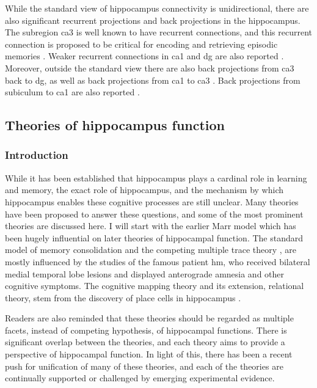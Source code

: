 While the standard view of hippocampus connectivity is unidirectional, there are also significant recurrent projections and back projections in the hippocampus. The subregion \gls{ca3} is well known to have recurrent connections, and this recurrent connection is proposed to be critical for encoding and retrieving episodic memories \citep{nakazawa02, rolls07}. Weaker recurrent connections in \gls{ca1} and \gls{dg} are also reported \citep{swanson81, ishizuka90, buckmaster93}. Moreover, outside the standard view there are also back projections from \gls{ca3} back to \gls{dg}, as well as back projections from \gls{ca1} to \gls{ca3} \citep{swanson81, li94}. Back projections from subiculum to \gls{ca1} are also reported \citep{finch83}. 

\subsection{Theories of hippocampus function}
\subsubsection{Introduction}
While it has been established that hippocampus plays a cardinal role in learning and memory, the exact role of hippocampus, and the mechanism by which hippocampus enables these cognitive processes are still unclear. Many theories have been proposed to answer these questions, and some of the most prominent theories are discussed here. I will start with the earlier Marr model \citep{marr71} which has been hugely influential on later theories of hippocampal function. The standard model of memory consolidation \citep{squire92} and the competing multiple trace theory \citep{nadel97}, are mostly influenced by the studies of the famous patient \gls{hm}, who received bilateral medial temporal lobe lesions and displayed anterograde amnesia and other cognitive symptoms. The cognitive mapping theory and its extension, relational theory, stem from the discovery of place cells in hippocampus \citep{o'keefe71}. 

Readers are also reminded that these theories should be regarded as multiple facets, instead of competing hypothesis, of hippocampal functions. There is significant overlap between the theories, and each theory aims to provide a perspective of hippocampal function. In light of this, there has been a recent push for unification of many of these theories, and each of the theories are continually supported or challenged by emerging experimental evidence.

